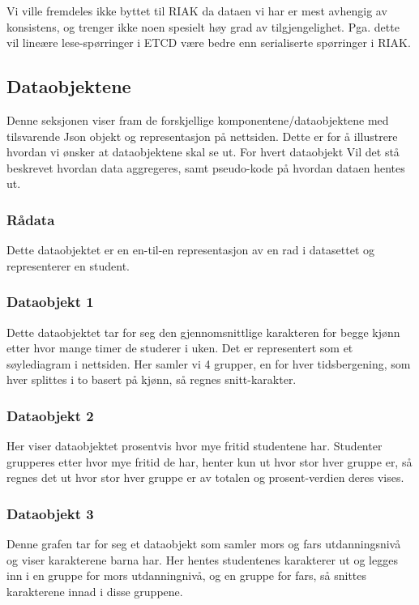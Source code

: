 Vi ville fremdeles ikke byttet til RIAK da dataen vi har er mest avhengig av konsistens, og trenger ikke noen spesielt høy grad av tilgjengelighet. Pga. dette vil lineære lese-spørringer i ETCD være bedre enn serialiserte spørringer i RIAK.

\subsection{Dataobjektene}
Denne seksjonen viser fram de forskjellige komponentene/dataobjektene med tilsvarende Json objekt og representasjon på nettsiden. Dette er for å illustrere hvordan vi ønsker at dataobjektene skal se ut. For hvert dataobjekt Vil det stå beskrevet hvordan data aggregeres, samt pseudo-kode på hvordan dataen hentes ut.

\subsubsection{Rådata}
Dette dataobjektet er en en-til-en representasjon av en rad i datasettet og representerer en student.

\subsubsection{Dataobjekt 1}
Dette dataobjektet tar for seg den gjennomsnittlige karakteren for begge kjønn etter hvor mange timer de studerer i uken. Det er representert som et søylediagram i nettsiden. Her samler vi 4 grupper, en for hver tidsbergening, som hver splittes i to basert på kjønn, så regnes snitt-karakter.

\subsubsection{Dataobjekt 2}
Her viser dataobjektet prosentvis hvor mye fritid studentene har. Studenter grupperes etter hvor mye fritid de har, henter kun ut hvor stor hver gruppe er, så regnes 
det ut hvor stor hver gruppe er av totalen og prosent-verdien deres vises.

\subsubsection{Dataobjekt 3}
Denne grafen tar for seg et dataobjekt som samler mors og fars utdanningsnivå og viser karakterene barna har. Her hentes studentenes karakterer ut og legges inn i en gruppe for mors utdanningnivå, og en gruppe for fars, så snittes karakterene innad i disse gruppene.

